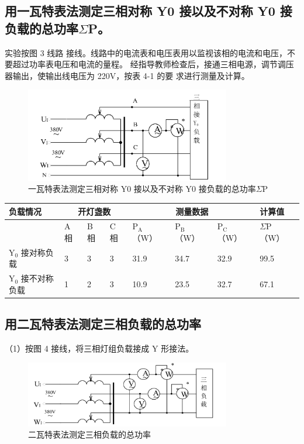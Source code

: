 \documentclass{article}
\begin{document}
\subsection{ 用一瓦特表法测定三相对称 Y0 接以及不对称 Y0 接负载的总功率$\Sigma$P。}

实验按图 3 线路
接线。线路中的电流表和电压表用以监视该相的电流和电压，不要超过功率表电压和电流的量程。 
经指导教师检查后，接通三相电源，调节调压器输出，使输出线电压为 220V，按表 4-1 的要
求进行测量及计算。

\begin{figure}[H]
    \centering
    \includegraphics[width=0.8\textwidth]{img3.png}
    \caption{一瓦特表法测定三相对称 Y0 接以及不对称 Y0 接负载的总功率$\Sigma$P}
\end{figure}



\begin{tabular}{|l|l|l|l|l|l|l|l|}
\hline \multirow{2}{*}{负载情况} & \multicolumn{3}{|c|}{开灯盏数} & \multicolumn{3}{|c|}{测量数据} & 计算值 \\
\hline & A 相 & B 相 & C 相 & $\mathrm{P}_{\mathrm{A}}$ （W） & $\mathrm{P}_{\mathrm{B}}$ （W） & $\mathrm{P}_{\mathrm{C}}$ （W） & $\Sigma \mathrm{P}$ （W） \\
\hline $\mathrm{Y}_0$ 接对称负载 & 3 & 3 & 3 & 31.9& 34.7& 32.9&99.5 \\
\hline $\mathrm{Y}_0$ 接不对称负载 & 1 & 2 & 3 &10.9 &23.5 &32.7 & 67.1\\
\hline
\end{tabular}
\subsection{用二瓦特表法测定三相负载的总功率 }

（1）按图 4 接线，将三相灯组负载接成 Y 形接法。

\begin{figure}[H]
    \centering
    \includegraphics[width=0.8\textwidth]{img4.png}
    \caption{二瓦特表法测定三相负载的总功率}
\end{figure}
\end{document}
